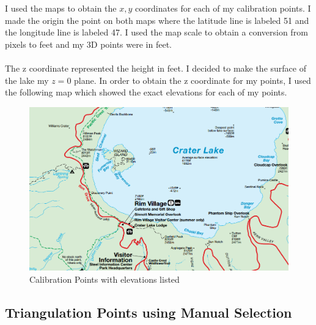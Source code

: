 \documentclass[11pt,psfig]{article}
\begin{document}
I used the maps to obtain the $x,y$ coordinates for each of my calibration points. I made the origin the point on both maps where the latitude line is labeled 51 and the longitude line is labeled 47. I used the map scale to obtain a conversion from pixels to feet and my 3D points were in feet.  \\
\\
The z coordinate represented the height in feet. I decided to make the surface of the lake my $z=0$ plane. In order to obtain the z coordinate for my points, I used the following map which showed the exact elevations for each of my points. 
\begin{figure}[H]
\centering
\includegraphics[width=\columnwidth]{sfmResults1/elevationsListed.png}
\caption{Calibration Points with elevations listed}
\end{figure}

\subsection{Triangulation Points using Manual Selection}
\end{document}
